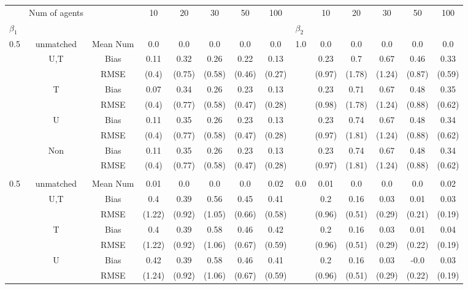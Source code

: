 \begin{tabular}{@{\extracolsep{5pt}}lc|cccccc|lccccc}
\toprule 
 & Num of agents &  & 10 & 20 & 30 & 50 & 100 &  & 10 & 20 & 30 & 50 & 100 \\
$\beta_1$ &  &  &  &  &  &  &  & $\beta_2$ &  &  &  &  &  \\
\midrule 
0.5 & unmatched & Mean Num & 0.0 & 0.0 & 0.0 & 0.0 & 0.0 & 1.0 & 0.0 & 0.0 & 0.0 & 0.0 & 0.0 \\
 & U,T & Bias & 0.11 & 0.32 & 0.26 & 0.22 & 0.13 &  & 0.23 & 0.7 & 0.67 & 0.46 & 0.33 \\
 &  & RMSE & (0.4) & (0.75) & (0.58) & (0.46) & (0.27) &  & (0.97) & (1.78) & (1.24) & (0.87) & (0.59) \\
 & T & Bias & 0.07 & 0.34 & 0.26 & 0.23 & 0.13 &  & 0.23 & 0.71 & 0.67 & 0.48 & 0.35 \\
 &  & RMSE & (0.4) & (0.77) & (0.58) & (0.47) & (0.28) &  & (0.98) & (1.78) & (1.24) & (0.88) & (0.62) \\
 & U & Bias & 0.11 & 0.35 & 0.26 & 0.23 & 0.13 &  & 0.23 & 0.74 & 0.67 & 0.48 & 0.34 \\
 &  & RMSE & (0.4) & (0.77) & (0.58) & (0.47) & (0.28) &  & (0.97) & (1.81) & (1.24) & (0.88) & (0.62) \\
 & Non & Bias & 0.11 & 0.35 & 0.26 & 0.23 & 0.13 &  & 0.23 & 0.74 & 0.67 & 0.48 & 0.34 \\
 &  & RMSE & (0.4) & (0.77) & (0.58) & (0.47) & (0.28) &  & (0.97) & (1.81) & (1.24) & (0.88) & (0.62) \\
 &  &  &  &  &  &  &  &  &  &  &  &  &  \\
0.5 & unmatched & Mean Num & 0.01 & 0.0 & 0.0 & 0.0 & 0.02 & 0.0 & 0.01 & 0.0 & 0.0 & 0.0 & 0.02 \\
 & U,T & Bias & 0.4 & 0.39 & 0.56 & 0.45 & 0.41 &  & 0.2 & 0.16 & 0.03 & 0.01 & 0.03 \\
 &  & RMSE & (1.22) & (0.92) & (1.05) & (0.66) & (0.58) &  & (0.96) & (0.51) & (0.29) & (0.21) & (0.19) \\
 & T & Bias & 0.4 & 0.39 & 0.58 & 0.46 & 0.42 &  & 0.2 & 0.16 & 0.03 & 0.01 & 0.04 \\
 &  & RMSE & (1.22) & (0.92) & (1.06) & (0.67) & (0.59) &  & (0.96) & (0.51) & (0.29) & (0.22) & (0.19) \\
 & U & Bias & 0.42 & 0.39 & 0.58 & 0.46 & 0.41 &  & 0.2 & 0.16 & 0.03 & -0.0 & 0.03 \\
 &  & RMSE & (1.24) & (0.92) & (1.06) & (0.67) & (0.59) &  & (0.96) & (0.51) & (0.29) & (0.22) & (0.19) \\

\end{tabular}
